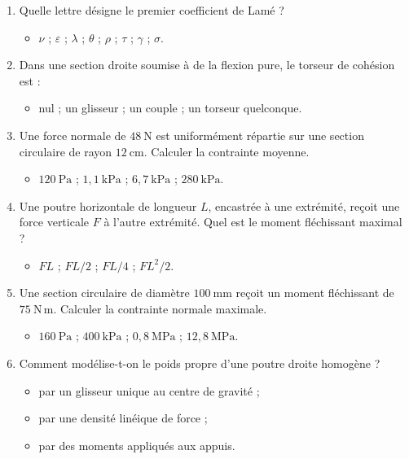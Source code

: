 \begin{enumerate}
  \item Quelle lettre désigne le premier coefficient de Lamé ?
  \begin{itemize}
    \item $\nu$ ; $\varepsilon$ ; $\lambda$ ; $\theta$ ; $\rho$ ; $\tau$ ; $\gamma$ ; $\sigma$.
  \end{itemize}

  \item Dans une section droite soumise à de la flexion pure, le torseur de cohésion est :
  \begin{itemize}
    \item nul ; un glisseur ; un couple ; un torseur quelconque.
  \end{itemize}

  \item Une force normale de $48\ \mathrm N$ est uniformément répartie sur une section circulaire de rayon $12\ \mathrm{cm}$. Calculer la contrainte moyenne.
  \begin{itemize}
    \item $120\ \mathrm{Pa}$ ; $1{,}1\ \mathrm{kPa}$ ; $6{,}7\ \mathrm{kPa}$ ; $280\ \mathrm{kPa}$.
  \end{itemize}

  \item Une poutre horizontale de longueur $L$, encastrée à une extrémité, reçoit une force verticale $F$ à l'autre extrémité. Quel est le moment fléchissant maximal ?
  \begin{itemize}
    \item $FL$ ; $FL/2$ ; $FL/4$ ; $FL^2/2$.
  \end{itemize}

  \item Une section circulaire de diamètre $100\ \mathrm{mm}$ reçoit un moment fléchissant de $75\ \mathrm{N\,m}$. Calculer la contrainte normale maximale.
  \begin{itemize}
    \item $160\ \mathrm{Pa}$ ; $400\ \mathrm{kPa}$ ; $0{,}8\ \mathrm{MPa}$ ; $12{,}8\ \mathrm{MPa}$.
  \end{itemize}

  \item Comment modélise-t-on le poids propre d'une poutre droite homogène ?
  \begin{itemize}
    \item par un glisseur unique au centre de gravité ;
    \item par une densité linéique de force ;
    \item par des moments appliqués aux appuis.
  \end{itemize}


\end{enumerate}
